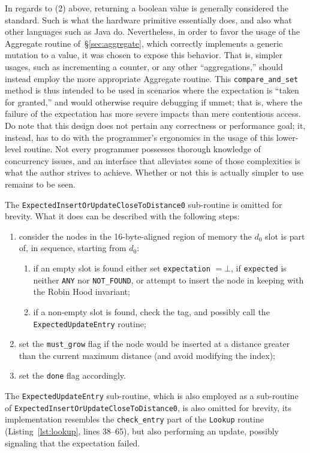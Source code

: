 In regards to (2) above, returning a boolean value is generally considered the standard.
Such is what the hardware primitive essentially does, and also what other languages such as Java do.
Nevertheless, in order to favor the usage of the Aggregate routine of~\S\ref{sec:aggregate}, which correctly implements a generic mutation to a value, it was chosen to expose this behavior.
That is, simpler usages, such as incrementing a counter, or any other ``aggregations,'' should instead employ the more appropriate Aggregate routine.
This \texttt{compare\_and\_set} method is thus intended to be used in scenarios where the expectation is ``taken for granted,'' and would otherwise require debugging if unmet; that is, where the failure of the expectation has more severe impacts than mere contentious access.
Do note that this design does not pertain any correctness or performance goal; it, instead, has to do with the programmer's ergonomics in the usage of this lower-level routine.
Not every programmer possesses thorough knowledge of concurrency issues, and an interface that alleviates some of those complexities is what the author strives to achieve.
Whether or not this is actually simpler to use remains to be seen.

The \texttt{ExpectedInsertOrUpdateCloseToDistance0} sub-routine is omitted for brevity.
What it does can be described with the following steps:
\begin{enumerate}
	\item consider the nodes in the 16-byte-aligned region of memory the $d_0$ slot is part of, in sequence, starting from $d_0$:
	\begin{enumerate}
		\item if an empty slot is found either set \texttt{expectation} $=\bot$, if \texttt{expected} is neither \texttt{ANY} nor \texttt{{NOT\_FOUND}}, or attempt to insert the node in keeping with the Robin Hood invariant;
		\item if a non-empty slot is found, check the tag, and possibly call the \texttt{ExpectedUpdateEntry} routine;
	\end{enumerate}
	\item set the \texttt{{must\_grow}} flag if the node would be inserted at a distance greater than the current maximum distance (and avoid modifying the index);
	\item set the \texttt{done} flag accordingly.
\end{enumerate}

The \texttt{ExpectedUpdateEntry} sub-routine, which is also employed as a sub-routine of \texttt{ExpectedInsertOrUpdateCloseToDistance0}, is also omitted for brevity, its implementation resembles the \texttt{{check\_entry}} part of the \texttt{Lookup} routine (Listing~\ref{lst:lookup}, lines 38--65), but also performing an update, possibly signaling that the expectation failed.


